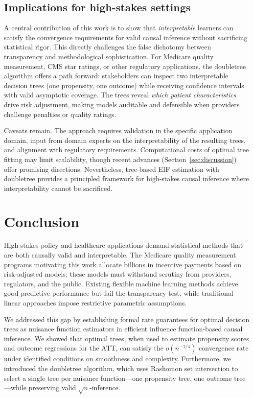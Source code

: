 \documentclass[12pt]{article}
\begin{document}
\subsection{Implications for high-stakes settings}

A central contribution of this work is to show that \emph{interpretable} learners can satisfy the convergence requirements for valid causal inference without sacrificing statistical rigor. This directly challenges the false dichotomy between transparency and methodological sophistication. For Medicare quality measurement, CMS star ratings, or other regulatory applications, the doubletree algorithm offers a path forward: stakeholders can inspect two interpretable decision trees (one propensity, one outcome) while receiving confidence intervals with valid asymptotic coverage. The trees reveal \emph{which patient characteristics} drive risk adjustment, making models auditable and defensible when providers challenge penalties or quality ratings.

Caveats remain. The approach requires validation in the specific application domain, input from domain experts on the interpretability of the resulting trees, and alignment with regulatory requirements. Computational costs of optimal tree fitting may limit scalability, though recent advances (Section~\ref{sec:discussion}) offer promising directions. Nevertheless, tree-based EIF estimation with doubletree provides a principled framework for high-stakes causal inference where interpretability cannot be sacrificed.

\section{Conclusion}
\label{sec:conclusion}

High-stakes policy and healthcare applications demand statistical methods that are both causally valid and interpretable. The Medicare quality measurement programs motivating this work allocate billions in incentive payments based on risk-adjusted models; these models must withstand scrutiny from providers, regulators, and the public. Existing flexible machine learning methods achieve good predictive performance but fail the transparency test, while traditional linear approaches impose restrictive parametric assumptions.

We addressed this gap by establishing formal rate guarantees for optimal decision trees as nuisance function estimators in efficient influence function-based causal inference. We showed that optimal trees, when used to estimate propensity scores and outcome regressions for the ATT, can satisfy the $o(n^{-1/4})$ convergence rate under identified conditions on smoothness and complexity. Furthermore, we introduced the doubletree algorithm, which uses Rashomon set intersection to select a single tree per nuisance function---one propensity tree, one outcome tree---while preserving valid $\sqrt{n}$-inference.
\end{document}
